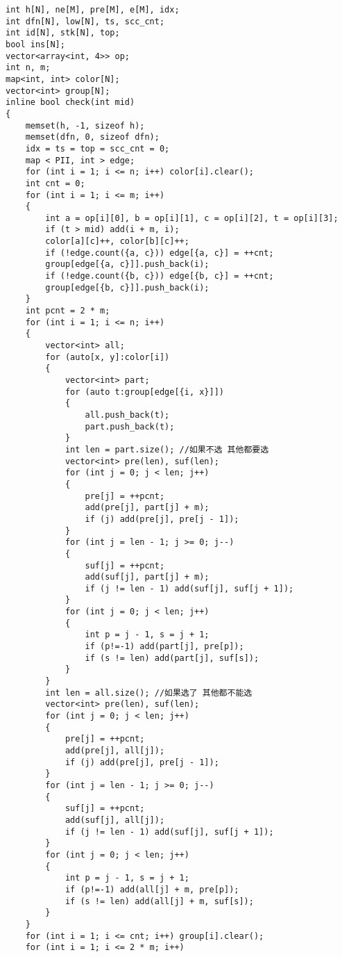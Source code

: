 \documentclass[a4paper,fontset=none]{ctexart}
\begin{document}
\begin{verbatim}
int h[N], ne[M], pre[M], e[M], idx;
int dfn[N], low[N], ts, scc_cnt;
int id[N], stk[N], top;
bool ins[N];
vector<array<int, 4>> op;
int n, m;
map<int, int> color[N];
vector<int> group[N];
inline bool check(int mid)
{
    memset(h, -1, sizeof h);
    memset(dfn, 0, sizeof dfn);
    idx = ts = top = scc_cnt = 0;
    map < PII, int > edge;
    for (int i = 1; i <= n; i++) color[i].clear();
    int cnt = 0;
    for (int i = 1; i <= m; i++)
    {
        int a = op[i][0], b = op[i][1], c = op[i][2], t = op[i][3];
        if (t > mid) add(i + m, i);
        color[a][c]++, color[b][c]++;
        if (!edge.count({a, c})) edge[{a, c}] = ++cnt;
        group[edge[{a, c}]].push_back(i);
        if (!edge.count({b, c})) edge[{b, c}] = ++cnt;
        group[edge[{b, c}]].push_back(i);
    }
    int pcnt = 2 * m;
    for (int i = 1; i <= n; i++)
    {
        vector<int> all;
        for (auto[x, y]:color[i])
        {
            vector<int> part;
            for (auto t:group[edge[{i, x}]])
            {
                all.push_back(t);
                part.push_back(t);
            }
            int len = part.size(); //如果不选 其他都要选
            vector<int> pre(len), suf(len);
            for (int j = 0; j < len; j++)
            {
                pre[j] = ++pcnt;
                add(pre[j], part[j] + m);
                if (j) add(pre[j], pre[j - 1]);
            }
            for (int j = len - 1; j >= 0; j--)
            {
                suf[j] = ++pcnt;
                add(suf[j], part[j] + m);
                if (j != len - 1) add(suf[j], suf[j + 1]);
            }
            for (int j = 0; j < len; j++)
            {
                int p = j - 1, s = j + 1;
                if (p!=-1) add(part[j], pre[p]);
                if (s != len) add(part[j], suf[s]);
            }
        }
        int len = all.size(); //如果选了 其他都不能选
        vector<int> pre(len), suf(len);
        for (int j = 0; j < len; j++)
        {
            pre[j] = ++pcnt;
            add(pre[j], all[j]);
            if (j) add(pre[j], pre[j - 1]);
        }
        for (int j = len - 1; j >= 0; j--)
        {
            suf[j] = ++pcnt;
            add(suf[j], all[j]);
            if (j != len - 1) add(suf[j], suf[j + 1]);
        }
        for (int j = 0; j < len; j++)
        {
            int p = j - 1, s = j + 1;
            if (p!=-1) add(all[j] + m, pre[p]);
            if (s != len) add(all[j] + m, suf[s]);
        }
    }
    for (int i = 1; i <= cnt; i++) group[i].clear();
    for (int i = 1; i <= 2 * m; i++)

\end{verbatim}
\end{document}
